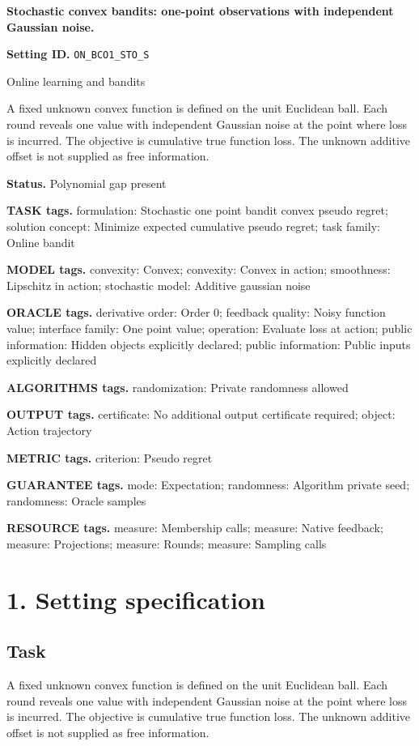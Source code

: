 \documentclass[10pt,a4paper]{article}
\begin{document}
\raggedright

{\LARGE\bfseries\sffamily\color{AtlasNavy} Stochastic convex bandits: one-point observations with independent Gaussian noise.\par}\vspace{5pt}
\textbf{Setting ID.} \texttt{ON\_\allowbreak{}BCO1\_\allowbreak{}STO\_\allowbreak{}S}

Online learning and bandits

A fixed unknown convex function is defined on the unit Euclidean ball. Each round reveals one value with independent Gaussian noise at the point where loss is incurred. The objective is cumulative true function loss. The unknown additive offset is not supplied as free information.

\textbf{Status.} Polynomial gap present

\textbf{TASK tags.} formulation: Stochastic one point bandit convex pseudo regret; solution concept: Minimize expected cumulative pseudo regret; task family: Online bandit

\textbf{MODEL tags.} convexity: Convex; convexity: Convex in action; smoothness: Lipschitz in action; stochastic model: Additive gaussian noise

\textbf{ORACLE tags.} derivative order: Order 0; feedback quality: Noisy function value; interface family: One point value; operation: Evaluate loss at action; public information: Hidden objects explicitly declared; public information: Public inputs explicitly declared

\textbf{ALGORITHMS tags.} randomization: Private randomness allowed

\textbf{OUTPUT tags.} certificate: No additional output certificate required; object: Action trajectory

\textbf{METRIC tags.} criterion: Pseudo regret

\textbf{GUARANTEE tags.} mode: Expectation; randomness: Algorithm private seed; randomness: Oracle samples

\textbf{RESOURCE tags.} measure: Membership calls; measure: Native feedback; measure: Projections; measure: Rounds; measure: Sampling calls

\section{1. Setting specification}
\subsection{Task}
A fixed unknown convex function is defined on the unit Euclidean ball. Each round reveals one value with independent Gaussian noise at the point where loss is incurred. The objective is cumulative true function loss. The unknown additive offset is not supplied as free information.
\end{document}
